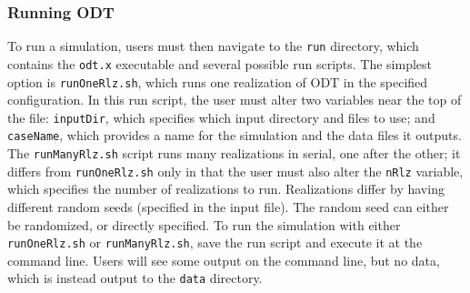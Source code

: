 \documentclass[preprint,12pt, a4paper]{elsarticle}
\begin{document}

\subsubsection{Running ODT}

To run a simulation, users must then navigate to the \texttt{run} directory, which contains the \texttt{odt.x} executable and several possible run scripts. The simplest option is \texttt{runOneRlz.sh}, which runs one realization of ODT in the specified configuration. In this run script, the user must alter two variables near the top of the file: \texttt{inputDir}, which specifies which input directory and files to use; and \texttt{caseName}, which provides a name for the simulation and the data files it outputs. The \texttt{runManyRlz.sh} script runs many realizations in serial, one after the other; it differs from \texttt{runOneRlz.sh} only in that the user must also alter the \texttt{nRlz} variable, which specifies the number of realizations to run. Realizations differ by having different random seeds (specified in the input file). The random seed can either be randomized, or directly specified. To run the simulation with either \texttt{runOneRlz.sh} or \texttt{runManyRlz.sh}, save the run script and execute it at the command line. Users will see some output on the command line, but no data, which is instead output to the \texttt{data} directory.  
\end{document}
